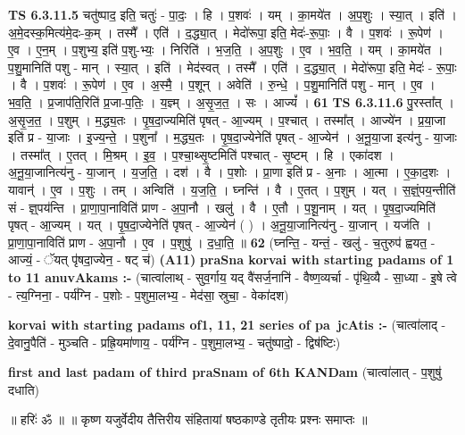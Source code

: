 \documentclass[17pt]{extarticle}
\begin{document}
                  \newline
                                \textbf{ TS 6.3.11.5} \newline
                  चतु॑ष्पाद॒ इति॒ चतुः॑ - पा॒दः॒ । हि । प॒शवः॑ । यम् । का॒मये॑त । अ॒प॒शुः । स्या॒त् । इति॑ । अ॒मे॒दस्क॒मित्य॑मे॒दः-क॒म् । तस्मै᳚ । एति॑ । द॒द्ध्या॒त् । मेदो॑रूपा॒ इति॒ मेदः॑-रू॒पाः॒ । वै । प॒शवः॑ । रू॒पेण॑ । ए॒व । ए॒न॒म् । प॒शुभ्य॒ इति॑ प॒शु-भ्यः॒ । निरिति॑ । भ॒ज॒ति॒ । अ॒प॒शुः । ए॒व । भ॒व॒ति॒ । यम् । का॒मये॑त । प॒शु॒मानिति॑ पशु - मान् । स्या॒त् । इति॑ । मेद॑स्वत् । तस्मै᳚ । एति॑ । द॒द्ध्या॒त् । मेदो॑रूपा॒ इति॒ मेदः॑ - रू॒पाः॒ । वै । प॒शवः॑ । रू॒पेण॑ । ए॒व । अ॒स्मै॒ । प॒शून् । अवेति॑ । रु॒न्धे॒ । प॒शु॒मानिति॑ पशु - मान् । ए॒व । भ॒व॒ति॒ । प्र॒जाप॑ति॒रिति॑ प्र॒जा-प॒तिः॒ । य॒ज्ञ्म् । अ॒सृ॒ज॒त॒ । सः । आज्यं᳚ । \textbf{  61} \newline
                  \newline
                                \textbf{ TS 6.3.11.6} \newline
                  पु॒रस्ता᳚त् । अ॒सृ॒ज॒त॒ । प॒शुम् । म॒द्ध्य॒तः । पृ॒ष॒दा॒ज्यमिति॑ पृषत् - आ॒ज्यम् । प॒श्चात् । तस्मा᳚त् । आज्ये॑न । प्र॒या॒जा इति॑ प्र - या॒जाः । इ॒ज्य॒न्ते॒ । प॒शुना᳚ । म॒द्ध्य॒तः । पृ॒ष॒दा॒ज्येनेति॑ पृषत् - आ॒ज्येन॑ । अ॒नू॒या॒जा इत्य॑नु - या॒जाः । तस्मा᳚त् । ए॒तत् । मि॒श्रम् । इ॒व॒ । प॒श्चा॒थ्सृ॒ष्टमिति॑ पश्चात् - सृ॒ष्टम् । हि । एका॑दश । अ॒नू॒या॒जानित्य॑नु - या॒जान् । य॒ज॒ति॒ । दश॑ । वै । प॒शोः । प्रा॒णा इति॑ प्र - अ॒नाः । आ॒त्मा । ए॒का॒द॒शः । यावान्॑ । ए॒व । प॒शुः । तम् । अन्विति॑ । य॒ज॒ति॒ । घ्नन्ति॑ । वै । ए॒तत् । प॒शुम् । यत् । स॒ज्ञ्ं॒पय॒न्तीति॑ सं - ज्ञ्॒पय॑न्ति । प्रा॒णा॒पा॒नाविति॑ प्राण - अ॒पा॒नौ । खलु॑ । वै । ए॒तौ । प॒शू॒नाम् । यत् । पृ॒ष॒दा॒ज्यमिति॑ पृषत् - आ॒ज्यम् । यत् । पृ॒ष॒दा॒ज्येनेति॑ पृषत् - आ॒ज्येन॑ ( ) । अ॒नू॒या॒जानित्य॑नु - या॒जान् । यज॑ति । प्रा॒णा॒पा॒नाविति॑ प्राण - अ॒पा॒नौ । ए॒व । प॒शुषु॑ । द॒धा॒ति॒ ॥ \textbf{  62 } \newline
                  \newline
                      (घ्नन्ति॒ - यन्तं॒ - खलु॑ - च॒तुरुप॑ ह्वयत॒ - आज्यं॒ - ॅयत् पृ॑षदा॒ज्येन॒ - षट् च॑)  \textbf{(A11)} \newline \newline
\textbf{praSna korvai with starting padams of 1 to 11 anuvAkams :-} \newline
(चात्वा॑लाथ् - सुव॒र्गाय॒ यद् वै॑सर्ज॒नानि॑ - वैष्ण॒व्यर्चा - पृ॑थि॒व्यै - सा॒ध्या - इ॒षे त्वे - त्य॒ग्निना॒ - पर्य॑ग्नि - प॒शोः - प॒शुमा॒लभ्य॒ - मेद॑सा॒ स्रुचा॒ - वेका॑दश) \newline

\textbf{korvai with starting padams of1, 11, 21 series of pa~jcAtis :-} \newline
(चात्वा॑लाद् - दे॒वानु॒पैति॑ - मुञ्चति - प्रह्रि॒यमा॑णाय॒ - पर्य॑ग्नि - प॒शुमा॒लभ्य॒ - चतु॑ष्पादो॒ - द्विष॑ष्टिः) \newline

\textbf{first and last padam of third praSnam of 6th KANDam} \newline
(चात्वा॑लात् - प॒शुषु॑ दधाति) \newline 


॥ हरिः॑ ॐ ॥
॥ कृष्ण यजुर्वेदीय तैत्तिरीय संहितायां षष्ठकाण्डे तृतीयः प्रश्नः समाप्तः ॥ \newline
\pagebreak
\pagebreak
        
\end{document}

